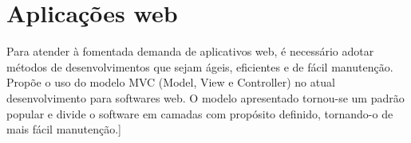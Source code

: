 \section{Aplicações web}\label{sec:apps_web}


Para atender à fomentada demanda de aplicativos web, é necessário adotar métodos de desenvolvimentos que sejam ágeis, eficientes e de fácil manutenção. \cite{1372143} Propõe o uso do modelo MVC (Model, View e Controller) no atual desenvolvimento para softwares web. O modelo apresentado tornou-se um padrão popular e divide o software em camadas com propósito definido, tornando-o de mais fácil manutenção.]


\section{}\label{sec:}


